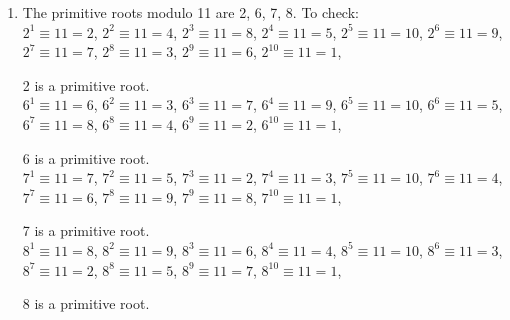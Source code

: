 {\begin{enumerate}
\begin{enumerate}[label=(\roman*)]
$3^{20} \equiv 14$,
$3^{21} \equiv 42$,
$3^{22} \equiv 40$,
$3^{23} \equiv 34$,
$3^{24} \equiv 16$,
$3^{25} \equiv 5$,
$3^{26} \equiv 15$,
$3^{27} \equiv 2$,
$3^{28} \equiv 6$,
$3^{29} \equiv 18$,
$3^{30} \equiv 11$,
$3^{31} \equiv 33$,
$3^{32} \equiv 13$,
$3^{33} \equiv 39$,
$3^{34} \equiv 31$,
$3^{35} \equiv 7$,
$3^{36} \equiv 21$,
$3^{37} \equiv 20$,
$3^{38} \equiv 17$,
$3^{39} \equiv 8$,
$3^{40} \equiv 24$,
$3^{41} \equiv 29$,
$3^{42} \equiv 1$, \\
$3$ is a primitive root.
    \end{enumerate}
    \item The primitive roots modulo 11 are 2, 6, 7, 8. To check: \\
    $2^1 \equiv 11 = 2$,
$2^2 \equiv 11 = 4$,
$2^3 \equiv 11 = 8$,
$2^4 \equiv 11 = 5$,
$2^5 \equiv 11 = 10$,
$2^6 \equiv 11 = 9$,
$2^7 \equiv 11 = 7$,
$2^8 \equiv 11 = 3$,
$2^9 \equiv 11 = 6$,
$2^{10} \equiv 11 = 1$,

2 is a primitive root. \\

$6^1 \equiv 11 = 6$,
$6^2 \equiv 11 = 3$,
$6^3 \equiv 11 = 7$,
$6^4 \equiv 11 = 9$,
$6^5 \equiv 11 = 10$,
$6^6 \equiv 11 = 5$,
$6^7 \equiv 11 = 8$,
$6^8 \equiv 11 = 4$,
$6^9 \equiv 11 = 2$,
$6^{10} \equiv 11 = 1$,

6 is a primitive root. \\

$7^1 \equiv 11 = 7$,
$7^2 \equiv 11 = 5$,
$7^3 \equiv 11 = 2$,
$7^4 \equiv 11 = 3$,
$7^5 \equiv 11 = 10$,
$7^6 \equiv 11 = 4$,
$7^7 \equiv 11 = 6$,
$7^8 \equiv 11 = 9$,
$7^9 \equiv 11 = 8$,
$7^{10} \equiv 11 = 1$,

7 is a primitive root. \\

$8^1 \equiv 11 = 8$,
$8^2 \equiv 11 = 9$,
$8^3 \equiv 11 = 6$,
$8^4 \equiv 11 = 4$,
$8^5 \equiv 11 = 10$,
$8^6 \equiv 11 = 3$,
$8^7 \equiv 11 = 2$,
$8^8 \equiv 11 = 5$,
$8^9 \equiv 11 = 7$,
$8^{10} \equiv 11 = 1$,

8 is a primitive root.
\end{enumerate}
}

